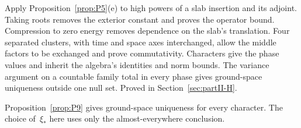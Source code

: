 Apply Proposition~\ref{prop:P5}\textup{(e)} to high powers of a slab insertion
and its adjoint. Taking roots removes the exterior constant and proves the
operator bound. Compression to zero energy removes dependence on the slab's
translation. Four separated clusters, with time and space axes interchanged,
allow the middle factors to be exchanged and prove commutativity.
Characters give the phase values and inherit the algebra's identities and norm
bounds. The variance argument on a countable family total in every phase gives
ground-space uniqueness outside one null set.
Proved in Section~\ref{sec:partII-H}.

\begin{remark}
Proposition~\ref{prop:P9} gives ground-space uniqueness for every character. The choice of~$\xi_*$ here uses only the almost-everywhere conclusion.
\end{remark}

